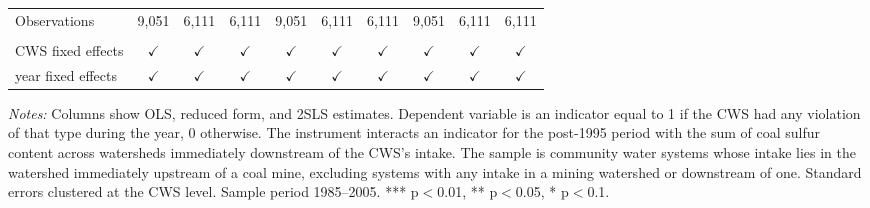 \begin{table}[htbp]
\begin{adjustbox}{width = \textwidth, center}
\begin{tabular}{lccccccccc}
          \\
         
         Observations                                                         & 9,051         & 6,111         & 6,111         & 9,051         & 6,111         & 6,111         & 9,051         & 6,111         & 6,111\\  
         
          \\
         
         CWS fixed effects                                                    & $\checkmark$  & $\checkmark$  & $\checkmark$  & $\checkmark$  & $\checkmark$  & $\checkmark$  & $\checkmark$  & $\checkmark$  & $\checkmark$\\   
         year fixed effects                                                   & $\checkmark$  & $\checkmark$  & $\checkmark$  & $\checkmark$  & $\checkmark$  & $\checkmark$  & $\checkmark$  & $\checkmark$  & $\checkmark$\\   
         
         \bottomrule
         
      \end{tabular}
      
      
      
   \end{adjustbox}
      {\tiny\linespread{1}\selectfont \par \raggedright 
   \textit{Notes:} Columns show OLS, reduced form, and 2SLS estimates. Dependent variable is an indicator equal to 1 if the CWS had any violation of that type during the year, 0 otherwise. The instrument interacts an indicator for the post-1995 period with the sum of coal sulfur content across watersheds immediately downstream of the CWS's intake. The sample is community water systems whose intake lies in the watershed immediately upstream of a coal mine, excluding systems with any intake in a mining watershed or downstream of one. Standard errors clustered at the CWS level. Sample period 1985--2005. *** p$<$0.01, ** p$<$0.05, * p$<$0.1.}
   
\end{table}


